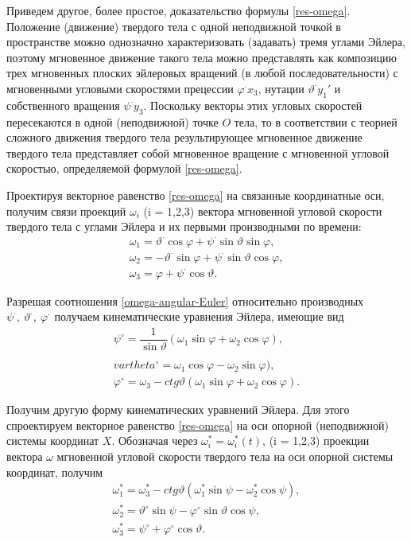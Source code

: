 \documentclass[14pt]{extreport}
\renewcommand{\phi}{\varphi} %
\begin{document}
Приведем другое, более простое, доказательство формулы \eqref{res-omega}. Положение (движение) твердого тела с одной неподвижной точкой в пространстве можно однозначно характеризовать (задавать) тремя углами Эйлера, поэтому мгновенное движение такого тела можно представлять как композицию трех мгновенных плоских эйлеровых вращений (в любой последовательности) с мгновенными угловыми скоростями прецессии $\phi^{\cdot} x_{3}$, нутации $\vartheta^{\cdot} y_{1}'$ и собственного вращения $\psi^{\cdot} y_{3}$. Поскольку векторы этих угловых скоростей пересекаются в одной (неподвижной) точке $O$ тела, то в соответствии с теорией сложного движения твердого тела результирующее мгновенное движение твердого тела представляет собой мгновенное вращение с мгновенной угловой скоростью, определяемой формулой \eqref{res-omega}.

Проектируя векторное равенство \eqref{res-omega} на связанные координатные оси, получим связи проекций $\omega_{i}$ (i = 1,2,3) вектора мгновенной угло­вой скорости твердого тела с углами Эйлера и их первыми производ­ными по времени:
\begin{equation}
\label{omega-angular-Euler}
\begin{split}
\omega_{1}=\vartheta^{\cdot}\cos\phi+\psi^{\cdot}\sin\vartheta\sin\phi,\\
\omega_{2}=-\vartheta^{\cdot}\sin\phi+\psi^{\cdot}\sin\vartheta\cos\phi,\\
\omega_{3}=\phi+\psi^{\cdot}\cos\vartheta.
\end{split}
\end{equation}

Разрешая соотношения \eqref{omega-angular-Euler} относительно производных $\psi^{\cdot},\ \vartheta^{\cdot},\ \phi^{\cdot}$ получаем кинематические уравнения Эйлера, имеющие вид
\begin{equation}
\label{kinematic-eq-Euler}
\begin{split}
\psi^{\circ}=\dfrac{1}{\sin\vartheta}(\omega_1\sin\phi+\omega_2\cos\phi),\\
\\vartheta^{\circ}=\omega_1\cos\phi-\omega_2\sin\phi),\\
\phi^{\circ}=\omega_3-ctg\vartheta(\omega_1\sin\phi+\omega_2\cos\phi).
\end{split}
\end{equation}

Получим другую форму кинематических уравнений Эйлера. Для этого спроектируем векторное равенство \eqref{res-omega} на оси опорной (непо­движной) системы координат $X$. Обозначая через $\omega_i^{*}=\omega_i^{*}(t)$, (i = 1,2,3) проекции вектора $\omega$ мгновенной угловой скорости твердого тела на оси опорной системы координат, получим
\begin{equation}
\label{kinematic-eq-Euler2}
\begin{split}
\omega_{1}^{*}=\omega_3^{*}-ctg\vartheta(\omega_1^{*}\sin\psi-\omega_2^{*}\cos\psi),\\
\omega_{2}^{*}=\vartheta^{\circ}\sin\psi-\phi^{\circ}\sin\vartheta\cos\psi,\\
\omega_{3}^{*}=\psi^{\circ}+\phi^{\circ}\cos\vartheta.
\end{split}
\end{equation}
\end{document}

